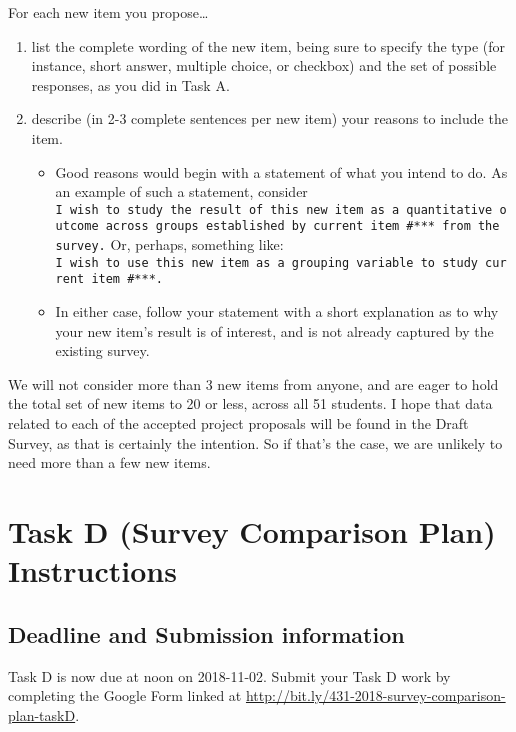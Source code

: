 \documentclass[]{book}
\providecommand{\tightlist}{%
  \setlength{\itemsep}{0pt}\setlength{\parskip}{0pt}}
\theoremstyle{definition}
\theoremstyle{definition}
\theoremstyle{definition}
\theoremstyle{remark}
\begin{document}
For each new item you propose\ldots{}

\begin{enumerate}
\def\labelenumi{\arabic{enumi}.}
\tightlist
\item
  list the complete wording of the new item, being sure to specify the
  type (for instance, short answer, multiple choice, or checkbox) and
  the set of possible responses, as you did in Task A.
\item
  describe (in 2-3 complete sentences per new item) your reasons to
  include the item.

  \begin{itemize}
  \tightlist
  \item
    Good reasons would begin with a statement of what you intend to do.
    As an example of such a statement, consider
    \texttt{I\ wish\ to\ study\ the\ result\ of\ this\ new\ item\ as\ a\ quantitative\ outcome\ across\ groups\ established\ by\ current\ item\ \#***\ from\ the\ survey.}
    Or, perhaps, something like:
    \texttt{I\ wish\ to\ use\ this\ new\ item\ as\ a\ grouping\ variable\ to\ study\ current\ item\ \#***.}
  \item
    In either case, follow your statement with a short explanation as to
    why your new item's result is of interest, and is not already
    captured by the existing survey.
  \end{itemize}
\end{enumerate}

We will not consider more than 3 new items from anyone, and are eager to
hold the total set of new items to 20 or less, across all 51 students. I
hope that data related to each of the accepted project proposals will be
found in the Draft Survey, as that is certainly the intention. So if
that's the case, we are unlikely to need more than a few new items.

\hypertarget{taskD}{%
\chapter{Task D (Survey Comparison Plan) Instructions}\label{taskD}}

\hypertarget{deadline-and-submission-information-3}{%
\section{Deadline and Submission
information}\label{deadline-and-submission-information-3}}

Task D is now due at noon on 2018-11-02. Submit your Task D work by
completing the Google Form linked at
\url{http://bit.ly/431-2018-survey-comparison-plan-taskD}.
\end{document}
